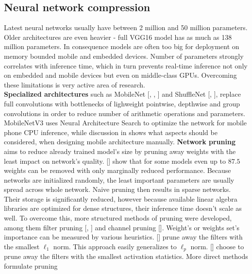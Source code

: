\documentclass[../Main.tex]{subfiles}
\begin{document}
\subsection{Neural network compression}
    Latest neural networks usually have between 2 million and 50 million parameters.
    Older architectures are even heavier - full VGG16 model has as much as
    138 million parameters. In consequence models 
    are often too big for deployment on memory bounded mobile and embedded devices.
    Number of parameters strongly correlates with inference time, which in turn
    prevents real-time inference not only on embedded and mobile
    devices but even on middle-class GPUs. Overcoming these limitations 
    is very active area of research.\\
    \textbf{Specialized architectures} such as MobileNet [\cite{mobilenetv1},
    \cite{mobilenetv2}, \cite{mobilenetv3}] and ShuffleNet [\cite{shufflenetv1},
    \cite{shufflenetv2}], replace full convolutions with bottlenecks of lighweight
    pointwise, depthwise and group convolutions in order to reduce number of 
    arithmetic operations and parameters. MobileNetV3 \cite{mobilenetv3} uses
    Neural Architecture Search to optimize the network for mobile phone CPU
    inference, while discussion in \cite{shufflenetv2} shows what aspects should
    be considered, when designing mobile architecture manually. 
    \textbf{Network pruning} aims to reduce already trained model's size by pruning away
    weights with the least impact on network's quality. [\cite{zhu2017prune}] show
    that for some models even up to $87.5$ weights can be removed with only 
    marginally reduced performance. 
    Because networks are initialized randomly, the least
    important parameters are usually spread across whole network. Naive pruning 
    then results in sparse networks. Their storage is significantly reduced, however
    because available linear algebra libraries are optimized for dense structures,
    their inference time doesn't scale as well. To overcome this, more structured
    methods of pruning were developed, among them filter pruning [\cite{li2016pruning},
    \cite{molchanov2016pruning}]
    and channel pruning [\cite{he2017channel}]. 
    Weight's or weights set's importance can be measured by various heuristics. 
    [\cite{li2016pruning}] prune away the filters with the smallest $\ell_1$ norm.
    This approach easily generalizes to $\ell_p$ norm.
    [\cite{polyak2015}] choose to prune away the filters with
    the smallest activation statistics. More direct methods formulate pruning 
\end{document}
